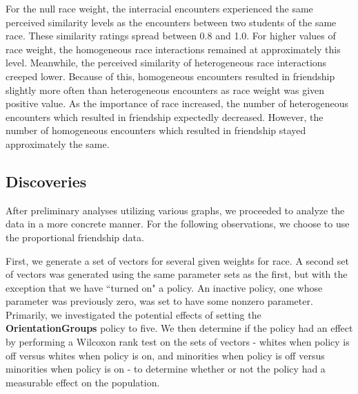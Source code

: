For the null race weight, the interracial encounters experienced the same perceived similarity levels as the 
encounters between two students of the same race. These similarity ratings spread between 0.8 and 1.0. For higher values of 
race weight, the homogeneous race interactions remained at approximately this level. Meanwhile, the perceived similarity of 
heterogeneous race interactions creeped lower. Because of this, homogeneous encounters resulted in friendship slightly more 
often than heterogeneous encounters as race weight was given positive value. As the importance of race increased, the number 
of heterogeneous encounters which resulted in friendship expectedly decreased. However, the number of homogeneous encounters 
which resulted in friendship stayed approximately the same.

\subsection{Discoveries}

After preliminary analyses utilizing various graphs, we proceeded to analyze the data in a more concrete manner. For the following observations, we 
choose to use the proportional friendship data.



First, we generate a set of vectors for several given weights for race. A second set of vectors was generated using the same parameter sets as the first, but with the 
exception that we have ``turned on" a policy. An inactive policy, one whose parameter was previously zero, was set to have some nonzero parameter. Primarily, 
we investigated the potential effects of setting the {\bf OrientationGroups} policy to five. We then 
determine if the policy had an effect by performing a Wilcoxon rank test on the sets of vectors - whites when policy is off versus whites when policy is on, and minorities when policy is off 
versus minorities when policy is on - to determine whether or not the policy had a measurable effect on the population.

